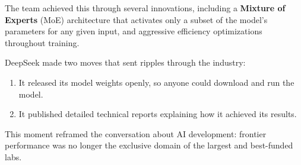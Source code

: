 The team achieved this through several innovations, including a \textbf{Mixture of Experts} (MoE) architecture that activates only a subset of the model's parameters for any given input, and aggressive efficiency optimizations throughout training.

DeepSeek made two moves that sent ripples through the industry:
\begin{enumerate}
    \item It released its model weights openly, so anyone could download and run the model.
    \item It published detailed technical reports explaining how it achieved its results.
\end{enumerate}

This moment reframed the conversation about AI development: frontier performance was no longer the exclusive domain of the largest and best-funded labs.
